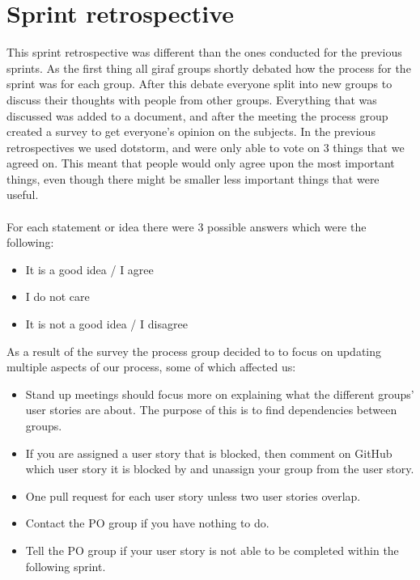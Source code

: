 \section{Sprint retrospective}
This sprint retrospective was different than the ones conducted for the previous sprints.
As the first thing all giraf groups shortly debated how the process for the sprint was for each group.
After this debate everyone split into new groups to discuss their thoughts with people from other groups.
Everything that was discussed was added to a document, and after the meeting the process group created a survey to get everyone's opinion on the subjects.
In the previous retrospectives we used dotstorm, and were only able to vote on 3 things that we agreed on.
This meant that people would only agree upon the most important things, even though there might be smaller less important things that were useful.
\\\\
For each statement or idea there were 3 possible answers which were the following:
\begin{itemize}
    \item It is a good idea / I agree
    \item I do not care
    \item It is not a good idea / I disagree
\end{itemize}
As a result of the survey the process group decided to to focus on updating multiple aspects of our process, some of which affected us:
\begin{itemize}
    \item Stand up meetings should focus more on explaining what the different groups' user stories are about. The purpose of this is to find dependencies between groups.
    \item If you are assigned a user story that is blocked, then comment on GitHub which user story it is blocked by and unassign your group from the user story.
    \item One pull request for each user story unless two user stories overlap.
    \item Contact the PO group if you have nothing to do.
    \item Tell the PO group if your user story is not able to be completed within the following sprint.
\end{itemize}

